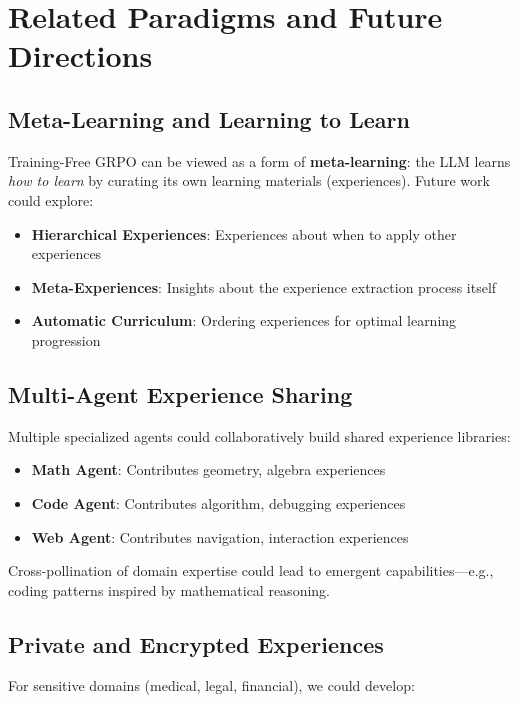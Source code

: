 \section{Related Paradigms and Future Directions}


\subsection{Meta-Learning and Learning to Learn}

Training-Free GRPO can be viewed as a form of \textbf{meta-learning}: the LLM learns \textit{how to learn} by curating its own learning materials (experiences). Future work could explore:

\begin{itemize}
    \item \textbf{Hierarchical Experiences}: Experiences about when to apply other experiences
    \item \textbf{Meta-Experiences}: Insights about the experience extraction process itself
    \item \textbf{Automatic Curriculum}: Ordering experiences for optimal learning progression
\end{itemize}

\subsection{Multi-Agent Experience Sharing}

Multiple specialized agents could collaboratively build shared experience libraries:

\begin{itemize}
    \item \textbf{Math Agent}: Contributes geometry, algebra experiences
    \item \textbf{Code Agent}: Contributes algorithm, debugging experiences
    \item \textbf{Web Agent}: Contributes navigation, interaction experiences
\end{itemize}

Cross-pollination of domain expertise could lead to emergent capabilities—e.g., coding patterns inspired by mathematical reasoning.

\subsection{Private and Encrypted Experiences}

For sensitive domains (medical, legal, financial), we could develop:

